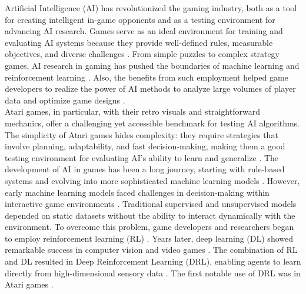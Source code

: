 Artificial Intelligence (AI) has revolutionized the gaming industry, both as a
tool for creating intelligent in-game opponents and as a testing environment
for advancing AI research. Games serve as an ideal environment for training and
evaluating AI systems because they provide well-defined rules, measurable
objectives, and diverse challenges \cite{skinner1938}\cite{georgios2018}. 
From simple puzzles to complex strategy games, AI research in gaming has pushed 
the boundaries of machine learning and reinforcement learning 
\cite{samuel1959}\cite{minsky1961}\cite{kaelbling1996}\cite{suttonbarto2018}. 
Also, the benefits from such employment helped game developers to realize 
the power of AI methods to analyze large volumes of player data and optimize 
game designs \cite{georgios2018}. \\

Atari games, in particular, with their retro visuals and straightforward
mechanics, offer a challenging yet accessible benchmark for testing AI
algorithms. The simplicity of Atari games hides complexity: they require 
strategies that involve planning, adaptability, and fast decision-making,
making them a good testing environment for evaluating AI’s ability to learn 
and generalize \cite{bellemare2013}\cite{mnih2015}. The development of AI in games 
has been a long journey, starting with rule-based systems and evolving into 
more sophisticated machine learning models \cite{samuel1959}\cite{minsky1961}. 
However, early machine learning models faced challenges in decision-making 
within interactive game environments \cite{puterman1994}\cite{howard1960}. 
Traditional supervised and unsupervised models depended on static datasets 
without the ability to interact dynamically with the environment. 
To overcome this problem, game developers and researchers began to employ 
reinforcement learning (RL) \cite{bellman1957}\cite{barto1983}\cite{sutton1988}\cite{watkins1992}\cite{dayan1992}. 
Years later, deep learning (DL) showed remarkable success in computer vision 
and video games \cite{lecun2015}\cite{goodfellow2016}\cite{I2}. The combination of RL and DL 
resulted in Deep Reinforcement Learning (DRL), enabling agents to learn directly 
from high-dimensional sensory data \cite{tsitsiklis1997}\cite{williams1992}. 
The first notable use of DRL was in Atari games \cite{I3}\cite{mnih2015}. \\

